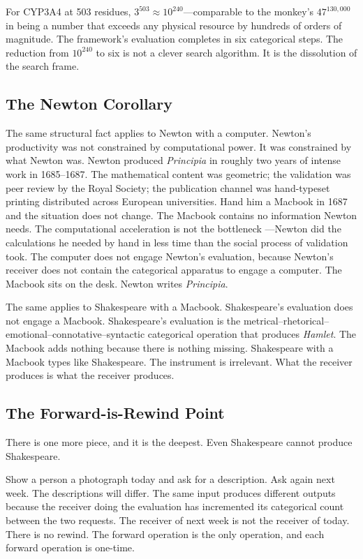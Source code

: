 \documentclass[11pt,twocolumn,a4paper]{article}
\theoremstyle{definition}
\theoremstyle{remark}
\begin{document}
For CYP3A4 at 503 residues, $3^{503} \approx 10^{240}$---comparable to the
monkey's $47^{130{,}000}$ in being a number that exceeds any physical resource
by hundreds of orders of magnitude.  The framework's evaluation completes in
six categorical steps.  The reduction from $10^{240}$ to six is not a clever
search algorithm.  It is the dissolution of the search frame.

\subsection{The Newton Corollary}

The same structural fact applies to Newton with a computer.  Newton's
productivity was not constrained by computational power.  It was constrained
by what Newton was.  Newton produced \textit{Principia} in roughly two years
of intense work in 1685--1687.  The mathematical content was geometric; the
validation was peer review by the Royal Society; the publication channel was
hand-typeset printing distributed across European universities.  Hand him a
Macbook in 1687 and the situation does not change.  The Macbook contains no
information Newton needs.  The computational acceleration is not the bottleneck
---Newton did the calculations he needed by hand in less time than the social
process of validation took.  The computer does not engage Newton's evaluation,
because Newton's receiver does not contain the categorical apparatus to engage
a computer.  The Macbook sits on the desk.  Newton writes \textit{Principia}.

The same applies to Shakespeare with a Macbook.  Shakespeare's evaluation does
not engage a Macbook.  Shakespeare's evaluation is the metrical--rhetorical--%
emotional--connotative--syntactic categorical operation that produces
\textit{Hamlet}.  The Macbook adds nothing because there is nothing missing.
Shakespeare with a Macbook types like Shakespeare.  The instrument is
irrelevant.  What the receiver produces is what the receiver produces.

\subsection{The Forward-is-Rewind Point}

There is one more piece, and it is the deepest.  Even Shakespeare cannot
produce Shakespeare.

Show a person a photograph today and ask for a description.  Ask again next
week.  The descriptions will differ.  The same input produces different outputs
because the receiver doing the evaluation has incremented its categorical count
between the two requests.  The receiver of next week is not the receiver of
today.  There is no rewind.  The forward operation is the only operation, and
each forward operation is one-time.
\end{document}
